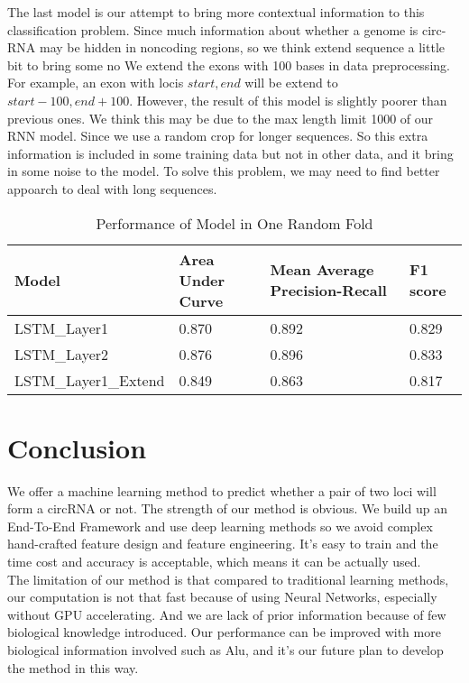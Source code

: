 \documentclass[paper=a4, fontsize=11pt] {scrartcl} %
\numberwithin{equation}{section} %
\numberwithin{figure}{section} %
\numberwithin{table}{section} %
\begin{document}
The last model is our attempt to bring more contextual information to this classification problem. Since much information about whether a genome is circ-RNA may be hidden in noncoding regions, so we think extend sequence a little bit to bring some no  We extend the exons with 100 bases in data preprocessing. For example, an exon with locis $start,end$ will be extend to $start-100,end+100$. However, the result of this model is slightly poorer than previous ones. We think this may be due to the max length limit 1000 of our RNN model. Since we use a random crop for longer sequences. So this extra information is included in some training data but not in other data, and it bring in some noise to the model. To solve this problem, we may need to find better appoarch to deal with long sequences.
\begin{table}[]
\centering
\caption{Performance of Model in One Random Fold}
\label{results}
\begin{tabular}{llll}
\hline
Model & Area Under Curve & Mean Average Precision-Recall & F1 score \\ \hline
LSTM\_Layer1 & 0.870            & 0.892                         & 0.829    \\
LSTM\_Layer2 & 0.876 & 0.896 & 0.833  \\  
LSTM\_Layer1\_Extend & 0.849 &  0.863 & 0.817 \\ \hline
\end{tabular}
\end{table}



\section{Conclusion}

We offer a machine learning method to predict whether a pair of two loci will form a circRNA or not. The strength of our method is obvious. We build up an End-To-End Framework and use deep learning methods so we avoid complex hand-crafted feature design and feature engineering. It's easy to train and the time cost and accuracy is acceptable, which means it can be actually used.\\

The limitation of our method is that compared to traditional learning methods, our computation is not that fast because of using Neural Networks, especially without GPU accelerating. And we are lack of  prior information because of few biological knowledge introduced. Our performance can be improved with more biological information involved such as Alu, and it's our future plan to develop the method in this way.\\

\nocite{*}

\end{document}
